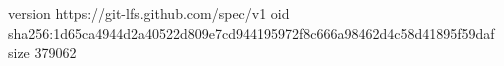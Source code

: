 version https://git-lfs.github.com/spec/v1
oid sha256:1d65ca4944d2a40522d809e7cd944195972f8c666a98462d4c58d41895f59daf
size 379062
